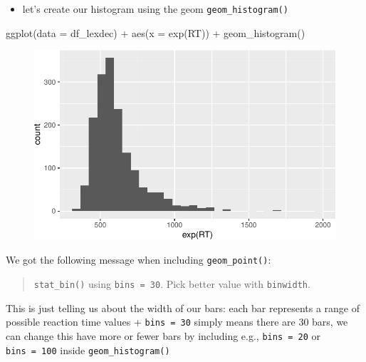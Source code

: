 \documentclass[
  letterpaper,
  DIV=11]{scrartcl}
\newenvironment{Shaded}{\begin{snugshade}}{\end{snugshade}}
\newcommand{\AttributeTok}[1]{\textcolor[rgb]{0.40,0.45,0.13}{#1}}
\newcommand{\FunctionTok}[1]{\textcolor[rgb]{0.28,0.35,0.67}{#1}}
\newcommand{\NormalTok}[1]{\textcolor[rgb]{0.00,0.23,0.31}{#1}}
\newcommand{\SpecialCharTok}[1]{\textcolor[rgb]{0.37,0.37,0.37}{#1}}
\providecommand{\tightlist}{%
  \setlength{\itemsep}{0pt}\setlength{\parskip}{0pt}}\usepackage{longtable,booktabs,array}
\theoremstyle{definition}
\theoremstyle{remark}
\begin{document}
\begin{itemize}
\tightlist
\item
  let's create our histogram using the geom \texttt{geom\_histogram()}
\end{itemize}

\begin{Shaded}
\begin{Highlighting}[]
\FunctionTok{ggplot}\NormalTok{(}\AttributeTok{data =}\NormalTok{ df\_lexdec) }\SpecialCharTok{+}
  \FunctionTok{aes}\NormalTok{(}\AttributeTok{x =} \FunctionTok{exp}\NormalTok{(RT)) }\SpecialCharTok{+}
  \FunctionTok{geom\_histogram}\NormalTok{()}
\end{Highlighting}
\end{Shaded}

\begin{figure}[H]

{\centering \includegraphics{_intro_r_slides_files/figure-pdf/unnamed-chunk-18-1.pdf}

}

\end{figure}

\begin{tcolorbox}[enhanced jigsaw, colbacktitle=quarto-callout-note-color!10!white, rightrule=.15mm, toptitle=1mm, bottomtitle=1mm, breakable, leftrule=.75mm, toprule=.15mm, left=2mm, coltitle=black, opacitybacktitle=0.6, title=\textcolor{quarto-callout-note-color}{\faInfo}\hspace{0.5em}{Hinweis}, colback=white, titlerule=0mm, arc=.35mm, bottomrule=.15mm, opacityback=0, colframe=quarto-callout-note-color-frame]

We got the following message when including \texttt{geom\_point()}:

\begin{quote}
\texttt{stat\_bin()} using \texttt{bins\ =\ 30}. Pick better value with
\texttt{binwidth}.
\end{quote}

This is just telling us about the width of our bars: each bar represents
a range of possible reaction time values + \texttt{bins\ =\ 30} simply
means there are 30 bars, we can change this have more or fewer bars by
including e.g., \texttt{bins\ =\ 20} or \texttt{bins\ =\ 100} inside
\texttt{geom\_histogram()}

\end{tcolorbox}
\end{document}

